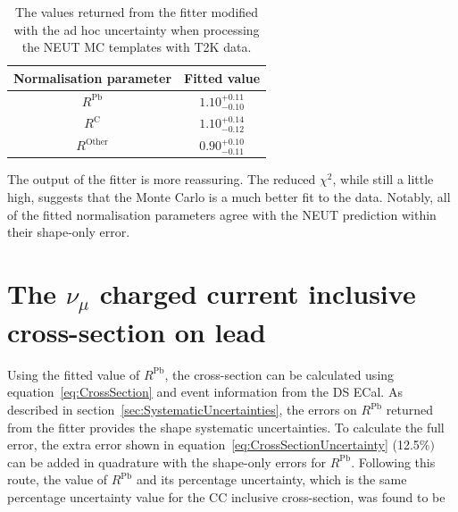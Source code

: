 \begin{table}[b!]
  \begin{tabular}{c c }
    Normalisation parameter & Fitted value \\ \hline \hline
    $R^{\textrm{Pb}}$ & $1.10^{+0.11}_{-0.10}$  \\
    $R^{\textrm{C}}$ & $1.10^{+0.14}_{-0.12}$  \\
    $R^{\textrm{Other}}$ & $0.90^{+0.10}_{-0.11}$  \\
  \end{tabular}
  \caption{The values returned from the fitter modified with the ad hoc uncertainty  when processing the NEUT MC templates with T2K data.}
  \label{table:NEUTMCTemplatesT2KDataFitParametersWithFudge}
\end{table}
\newline
\newline
The output of the fitter is more reassuring.  The reduced $\chi^2$, while still a little high, suggests that the Monte Carlo is a much better fit to the data.  Notably, all of the fitted normalisation parameters agree with the NEUT prediction within their shape-only error.

\section{The $\nu_\mu$ charged current inclusive cross-section on lead}
\label{sec:PbCrossSection}
Using the fitted value of $R^{\textrm{Pb}}$, the cross-section can be calculated using equation~\ref{eq:CrossSection} and event information from the DS ECal.  As described in section~\ref{sec:SystematicUncertainties}, the errors on $R^{\textrm{Pb}}$ returned from the fitter provides the shape systematic uncertainties.  To calculate the full error, the extra error shown in equation~\ref{eq:CrossSectionUncertainty} (12.5$\%)$ can be added in quadrature with the shape-only errors for $R^{\textrm{Pb}}$.  Following this route, the value of $R^{\textrm{Pb}}$ and its percentage uncertainty, which is the same percentage uncertainty value for the CC inclusive cross-section, was found to be

